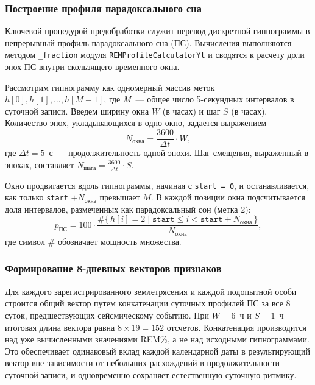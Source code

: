 \documentclass[14pt]{mmcs_article}
\begin{document}
\subsubsection*{Построение профиля парадоксального сна}

Ключевой процедурой предобработки служит перевод дискретной
гипнограммы в непрерывный профиль парадоксального сна (ПС).
Вычисления выполняются методом \texttt{\_fraction} модуля\linebreak
\texttt{REMProfileCalculatorYt} и сводятся к расчету доли эпох
ПС внутри скользящего временного окна.

Рассмотрим гипнограмму как одномерный массив меток\linebreak
$h[0], h[1], \dots, h[M-1]$, где $M$~--- общее число
5-секундных интервалов в суточной записи. Введем ширину окна
$W$ (в часах) и шаг $S$ (в часах). Количество эпох,
укладывающихся в одно окно, задается выражением
\begin{equation}
	N_{\text{окна}} = \frac{3600}{\Delta t} \cdot W,
\end{equation}
где $\Delta t = 5$~с~--- продолжительность одной эпохи. Шаг
смещения, выраженный в эпохах, составляет
$N_{\text{шага}} = \frac{3600}{\Delta t} \cdot S$.

Окно продвигается вдоль гипнограммы, начиная с
\texttt{start = 0}, и останавливается, как только
\texttt{start} $+ N_{\text{окна}}$ превышает $M$. В каждой
позиции окна подсчитывается доля интервалов, размеченных как
парадоксальный сон (метка 2):
\begin{equation}
	p_{\text{ПС}} = 100 \cdot
	\frac{\#\{\,h[i] = 2 \mid \texttt{start} \leq i <
		\texttt{start} + N_{\text{окна}}\,\}}
	{N_{\text{окна}}},
\end{equation}
где символ $\#$ обозначает мощность множества.

\subsubsection*{Формирование 8-дневных векторов признаков}

Для каждого зарегистрированного землетрясения и каждой
подопытной особи строится общий вектор путем конкатенации
суточных профилей ПС за все 8 суток, предшествующих
сейсмическому событию. При $W = 6$~ч и $S = 1$~ч итоговая
длина вектора равна $8 \times 19 = 152$ отсчетов. Конкатенация
производится над уже вычисленными значениями REM\%, а не над
исходными гипнограммами. Это обеспечивает одинаковый вклад
каждой календарной даты в результирующий вектор вне
зависимости от небольших расхождений в продолжительности
суточной записи, и одновременно сохраняет естественную
суточную ритмику.
\end{document}
